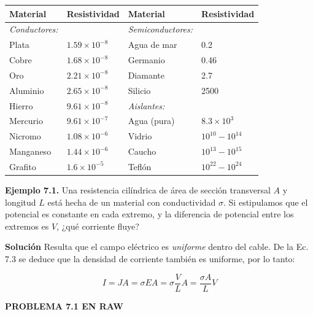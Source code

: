 \documentclass[12pt,a4paper]{report}
\newcommand{\esp}{\vspace{0.5cm}}
\begin{document}
	\begin{table}[h]
		\centering
		\begin{tabular}{ll|ll}
			\hline
			\textbf{Material} & \textbf{Resistividad} & \textbf{Material} & \textbf{Resistividad} \\ \hline
			\textit{Conductores:} & & \textit{Semiconductores:} & \\
			Plata & $1.59 \times 10^{-8}$ & Agua de mar & 0.2 \\
			Cobre & $1.68 \times 10^{-8}$ & Germanio & 0.46 \\
			Oro & $2.21 \times 10^{-8}$ & Diamante & 2.7 \\
			Aluminio & $2.65 \times 10^{-8}$ & Silicio & 2500 \\
			Hierro & $9.61 \times 10^{-8}$ & \textit{Aislantes:} & \\
			Mercurio & $9.61 \times 10^{-7}$ & Agua (pura) & $8.3 \times 10^3$ \\
			Nicromo & $1.08 \times 10^{-6}$ & Vidrio & $10^{10} - 10^{14}$ \\
			Manganeso & $1.44 \times 10^{-6}$ & Caucho & $10^{13} - 10^{15}$ \\
			Grafito & $1.6 \times 10^{-5}$ & Teflón & $10^{22} - 10^{24}$ \\ \hline
		\end{tabular}
	\end{table}
	
	\esp
	
	\textbf{Ejemplo 7.1.} Una resistencia cilíndrica de área de sección transversal $A$ y longitud $L$ está hecha de un material con conductividad $\sigma$. Si estipulamos que el potencial es constante en cada extremo, y la diferencia de potencial entre los extremos es $V$, ¿qué corriente fluye?
	
	\esp
	
	\textbf{Solución}
	Resulta que el campo eléctrico es \textit{uniforme} dentro del cable. De la Ec. 7.3 se deduce que la densidad de corriente también es uniforme, por lo tanto:
	
	\esp
	
	\begin{equation}
		I = JA = \sigma EA = \sigma \frac{V}{L} A = \frac{\sigma A}{L} V
	\end{equation}
	
	\esp
	
	\noindent\textbf{PROBLEMA 7.1 EN RAW}
	
	\esp
	
\end{document}
